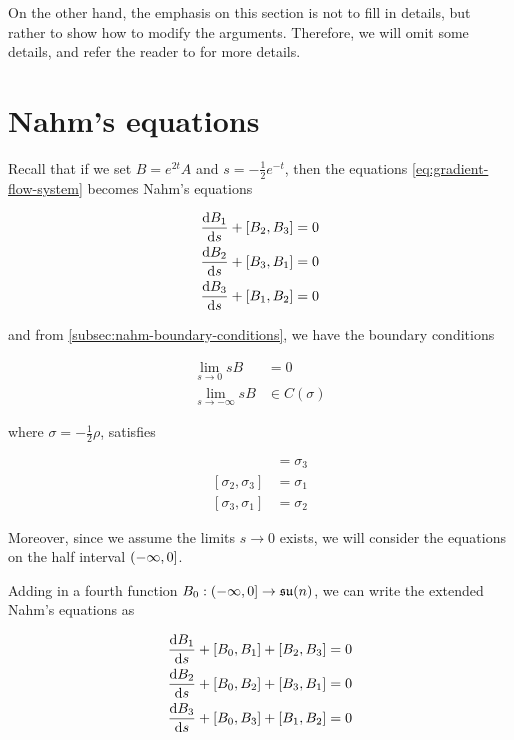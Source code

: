 \documentclass{report}
\newcommand{\su}{\mathfrak{su}}
\begin{document}
On the other hand, the emphasis on this section is not to fill in details, but rather to show how to modify the arguments. Therefore, we will omit some details, and refer the reader to \cite{kronheimer_hyper-kahlerian_1990} for more details.

\section{Nahm's equations}

Recall that if we set \(B = e^{2t}A\) and \(s = -\frac12e^{-t}\), then the equations \cref{eq:gradient-flow-system} becomes Nahm's equations

\begin{equation}
    \label{eq:nahm}
    \begin{split}
        \dv{B_1}{s} + [B_2, B_3] &= 0 \\
        \dv{B_2}{s} + [B_3, B_1] &= 0 \\
        \dv{B_3}{s} + [B_1, B_2] &= 0
    \end{split}
\end{equation}

and from \cref{subsec:nahm-boundary-conditions}, we have the boundary conditions

\begin{align*}
    \lim_{s \to 0}sB &= 0 \\
    \lim_{s \to -\infty}sB &\in C(\sigma)
\end{align*}

where \(\sigma = -\frac12\rho\), satisfies

\begin{align*}
    [\sigma_1, \sigma_2] &= \sigma_3 \\
    [\sigma_2, \sigma_3] &= \sigma_1 \\
    [\sigma_3, \sigma_1] &= \sigma_2
\end{align*}

Moreover, since we assume the limits \(s \to 0\) exists, we will consider the equations on the half interval \((-\infty, 0]\).

Adding in a fourth function \(B_0 : \Ioc{-\infty, 0} \to \su(n)\), we can write the extended Nahm's equations as

\begin{equation}
    \label{eq:extended-nahm}
    \begin{split}
        \dv{B_1}{s} + [B_0, B_1] + [B_2, B_3] &= 0 \\
        \dv{B_2}{s} + [B_0, B_2] + [B_3, B_1] &= 0 \\
        \dv{B_3}{s} + [B_0, B_3] + [B_1, B_2] &= 0
    \end{split}
\end{equation}
\end{document}
